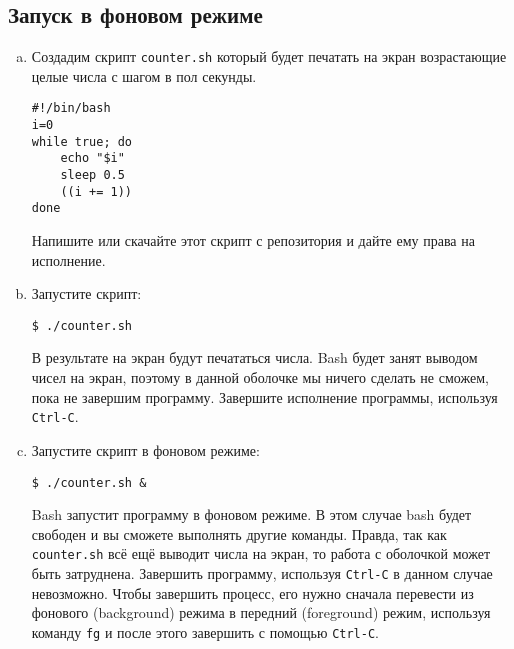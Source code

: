 \documentclass{article}
\begin{document}
\subsection{Запуск в фоновом режиме}
\begin{enumerate}[(a)]
\item Создадим скрипт \texttt{counter.sh} который будет печатать на экран возрастающие целые числа с шагом в пол секунды.
\begin{lstlisting}
#!/bin/bash
i=0
while true; do
    echo "$i"
    sleep 0.5
    ((i += 1))
done
\end{lstlisting}
Напишите или скачайте этот скрипт с репозитория и дайте ему права на исполнение.

\item Запустите скрипт:
\begin{lstlisting}
$ ./counter.sh
\end{lstlisting}
В результате на экран будут печататься числа. Bash будет занят выводом чисел на экран, поэтому в данной оболочке мы ничего сделать не сможем, пока не завершим программу. Завершите исполнение программы, используя \texttt{Ctrl-C}.


\item Запустите скрипт в фоновом режиме:
\begin{lstlisting}
$ ./counter.sh &
\end{lstlisting}
Bash запустит программу в фоновом режиме. В этом случае bash будет свободен и вы сможете выполнять другие команды. Правда, так как \texttt{counter.sh} всё ещё выводит числа на экран, то работа с оболочкой может быть затруднена. Завершить программу, используя \texttt{Ctrl-C} в данном случае невозможно. Чтобы завершить процесс, его нужно сначала перевести из фонового (background) режима в передний (foreground) режим, используя команду \texttt{fg} и после этого завершить с помощью \texttt{Ctrl-C}.


\end{enumerate}
\end{document}
